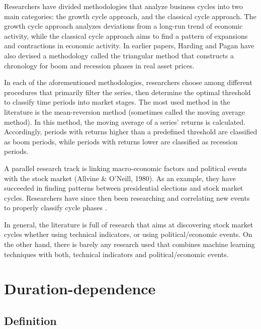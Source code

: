 \documentclass[]{book}
\begin{document}
Researchers have divided methodologies that analyze business cycles into two main categories: the growth cycle approach, and the classical cycle approach. \citep[McDermott and Scott, 1999;][]{harding2005suggested} The growth cycle approach analyzes deviations from a long-run trend of economic activity, while the classical cycle approach aims to find a pattern of expansions and contractions in economic activity. In earlier papers, Harding and Pagan \citetext{\citeyear{harding2001extracting}; \citeyear{harding2002dissecting}} have also devised a methodology called the triangular method that constructs a chronology for boom and recession phases in real asset prices.

In each of the aforementioned methodologies, researchers choose among different procedures that primarily filter the series, then determine the optimal threshold to classify time periods into market stages. The most used method in the literature is the mean-reversion method (sometimes called the moving average method). In this method, the moving average of a series' returns is calculated. Accordingly, periods with returns higher than a predefined threshold are classified as boom periods, while periods with returns lower are classified as recession periods. \citep{michaelides2017stock}

A parallel research track is linking macro-economic factors and political events with the stock market (Allvine \& O'Neill, 1980). As an example, they have succeeded in finding patterns between presidential elections and stock market cycles. Researchers have since then been researching and correlating new events to properly classify cycle phases \citep{santa2003presidential, herbst1984political}.

In general, the literature is full of research that aims at discovering stock market cycles whether using technical indicators, or using political/economic events. On the other hand, there is barely any research used that combines machine learning techniques with both, technical indicators and political/economic events.

\hypertarget{duration-dependence}{%
\section{Duration-dependence}\label{duration-dependence}}

\hypertarget{definition}{%
\subsection{Definition}\label{definition}}
\end{document}
